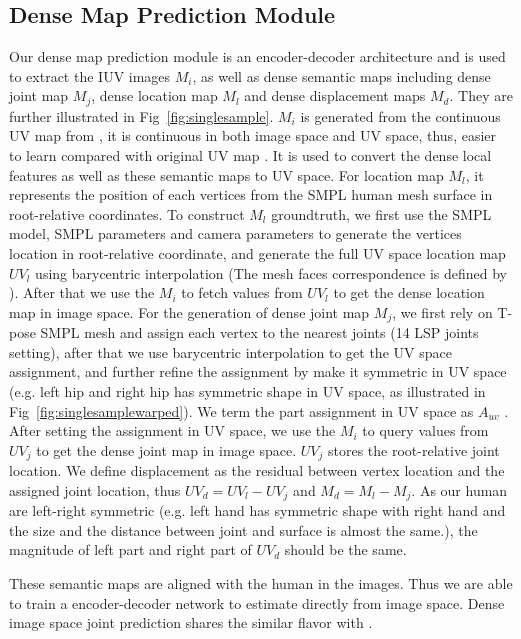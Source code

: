 \documentclass[10pt,twocolumn,letterpaper]{article}
\begin{document}
\subsection{Dense Map Prediction Module}

Our dense map prediction module is an encoder-decoder architecture and is used to extract the IUV images $M_i$, as well as dense semantic maps including dense joint map $M_j$, dense location map $M_l$ and dense displacement maps $M_d$. They are further illustrated in Fig~\ref{fig:singlesample}.  $M_i$ is generated from the continuous UV map from \cite{decomr}, it is continuous in both image space and UV space, thus, easier to learn compared with original UV map \cite{smpl}. It is used to convert the dense local features as well as these semantic maps to UV space. For location map $M_l$, it represents the position of each vertices from the SMPL human mesh surface in root-relative coordinates. To construct $M_l$ groundtruth, we first use the SMPL model, SMPL parameters and camera parameters to generate the vertices location in root-relative coordinate, and generate the full UV space location map $UV_l$ using barycentric interpolation (The mesh faces correspondence is defined by \cite{decomr}). After that we use the $M_i$ to fetch values from $UV_l$ to get the dense location map in image space.  For the generation of dense joint map $M_j$, we first rely on T-pose SMPL mesh and assign each vertex to the nearest joints (14 LSP joints setting), after that we use barycentric interpolation to get the UV space assignment, and further refine the assignment by make it symmetric in UV space (e.g. left hip and right hip has symmetric shape in UV space, as illustrated in Fig~\ref{fig:singlesamplewarped}). We term the part assignment in UV space  as $A_{uv}$ . After setting the assignment in UV space, we use the $M_i$ to query values from $UV_j$ to get the dense joint map in image space. $UV_j$ stores the root-relative joint location. We define displacement as the residual between vertex location and the assigned joint location, thus  $UV_d = UV_l - UV_j$ and $M_d = M_l - M_j$. As our human are left-right symmetric (e.g. left hand has symmetric shape with right hand and the size and the distance between joint and surface is almost the same.), the magnitude of left part and right part of $UV_d$ should be the same. 

These semantic maps are aligned with the human in the images. Thus we are able to train a encoder-decoder network to estimate directly from image space. Dense image space joint prediction shares the similar flavor with \cite{A2J,personlab}. 
\end{document}
